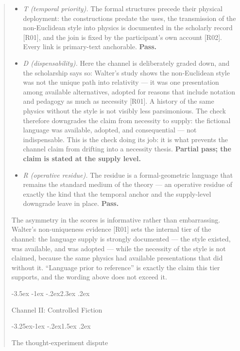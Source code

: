 \documentclass[11pt,a4paper]{article}
\makeatletter
\renewcommand\section{\@startsection{section}{1}{\z@}%
  {-3.5ex \@plus -1ex \@minus -.2ex}{2.3ex \@plus .2ex}%
  {\normalfont\Large\bfseries\raggedright}}
\renewcommand\subsection{\@startsection{subsection}{2}{\z@}%
  {-3.25ex\@plus -1ex \@minus -.2ex}{1.5ex \@plus .2ex}%
  {\normalfont\large\bfseries\raggedright}}
\makeatother
\begin{document}
\begin{abstract}
\begin{itemize}[leftmargin=1.6em,itemsep=2pt,parsep=0pt,topsep=3pt]
\item \textit{T (temporal priority).} The formal structures precede their physical deployment: the constructions predate the uses, the transmission of the non-Euclidean style into physics is documented in the scholarly record [R01], and the join is fixed by the participant's own account [R02]. Every link is primary-text anchorable. \textbf{Pass.}
\item \textit{D (dispensability).} Here the channel is deliberately graded down, and the scholarship says so: Walter's study shows the non-Euclidean style was not the unique path into relativity — it was one presentation among available alternatives, adopted for reasons that include notation and pedagogy as much as necessity [R01]. A history of the same physics without the style is not visibly less parsimonious. The check therefore downgrades the claim from necessity to supply: the fictional language was available, adopted, and consequential — not indispensable. This is the check doing its job: it is what prevents the channel claim from drifting into a necessity thesis. \textbf{Partial pass; the claim is stated at the supply level.}
\item \textit{R (operative residue).} The residue is a formal-geometric language that remains the standard medium of the theory — an operative residue of exactly the kind that the temporal anchor and the supply-level downgrade leave in place. \textbf{Pass.}
\end{itemize}

The asymmetry in the scores is informative rather than embarrassing. Walter's non-uniqueness evidence [R01] sets the internal tier of the channel: the language supply is strongly documented — the style existed, was available, and was adopted — while the necessity of the style is not claimed, because the same physics had available presentations that did without it. ``Language prior to reference'' is exactly the claim this tier supports, and the wording above does not exceed it.

\section{Channel II: Controlled Fiction}

\subsection{The thought-experiment dispute}


\end{abstract}
\end{document}

